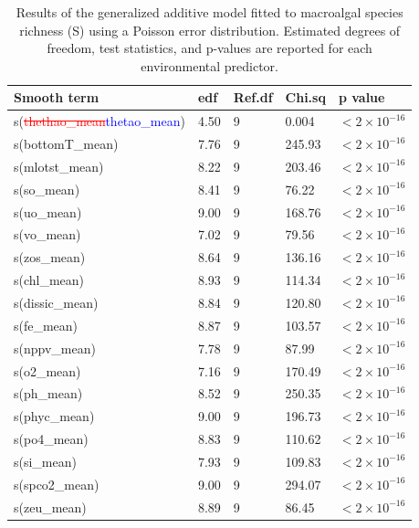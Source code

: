 \documentclass[a4paper,fleqn]{cas-sc}
\DeclareRobustCommand{\deleted}[1]{\textcolor{red}{\sout{#1}}}
\DeclareRobustCommand{\added}[1]{\textcolor{blue}{#1}}
\begin{document}
\begin{table}[width=\linewidth,cols=5,pos=!htbp]
\caption{Results of the generalized additive model fitted to macroalgal species richness (S) using a Poisson error distribution. Estimated degrees of freedom, test statistics, and p-values are reported for each environmental predictor.}
\small
\begin{tabular*}{\tblwidth}{@{} LLLLL @{}}
\toprule
\textbf{Smooth term} & \textbf{edf} & \textbf{Ref.df} & \textbf{Chi.sq} & \textbf{p value} \\
\midrule
s(\deleted{thethao\_mean}\added{thetao\_mean})      & 4.50 & 9 & 0.004  & \textbf{$<2 \times 10^{-16}$} \\
s(bottomT\_mean) & 7.76 & 9 & 245.93 & \textbf{$<2 \times 10^{-16}$} \\
s(mlotst\_mean)   & 8.22 & 9 & 203.46 & \textbf{$<2 \times 10^{-16}$} \\
s(so\_mean)       & 8.41 & 9 & 76.22  & \textbf{$<2 \times 10^{-16}$} \\
s(uo\_mean)       & 9.00 & 9 & 168.76 & \textbf{$<2 \times 10^{-16}$} \\
s(vo\_mean)       & 7.02 & 9 & 79.56  & \textbf{$<2 \times 10^{-16}$} \\
s(zos\_mean)      & 8.64 & 9 & 136.16 & \textbf{$<2 \times 10^{-16}$} \\
s(chl\_mean)      & 8.93 & 9 & 114.34 & \textbf{$<2 \times 10^{-16}$} \\
s(dissic\_mean)   & 8.84 & 9 & 120.80 & \textbf{$<2 \times 10^{-16}$} \\
s(fe\_mean)       & 8.87 & 9 & 103.57 & \textbf{$<2 \times 10^{-16}$} \\
s(nppv\_mean)     & 7.78 & 9 & 87.99  & \textbf{$<2 \times 10^{-16}$} \\
s(o2\_mean)       & 7.16 & 9 & 170.49 & \textbf{$<2 \times 10^{-16}$} \\
s(ph\_mean)       & 8.52 & 9 & 250.35 & \textbf{$<2 \times 10^{-16}$} \\
s(phyc\_mean)     & 9.00 & 9 & 196.73 & \textbf{$<2 \times 10^{-16}$} \\
s(po4\_mean)      & 8.83 & 9 & 110.62 & \textbf{$<2 \times 10^{-16}$} \\
s(si\_mean)       & 7.93 & 9 & 109.83 & \textbf{$<2 \times 10^{-16}$} \\
s(spco2\_mean)    & 9.00 & 9 & 294.07 & \textbf{$<2 \times 10^{-16}$} \\
s(zeu\_mean)      & 8.89 & 9 & 86.45  & \textbf{$<2 \times 10^{-16}$} \\
\bottomrule
\end{tabular*}
\label{tab:10}
\end{table}
\FloatBarrier
\end{document}
